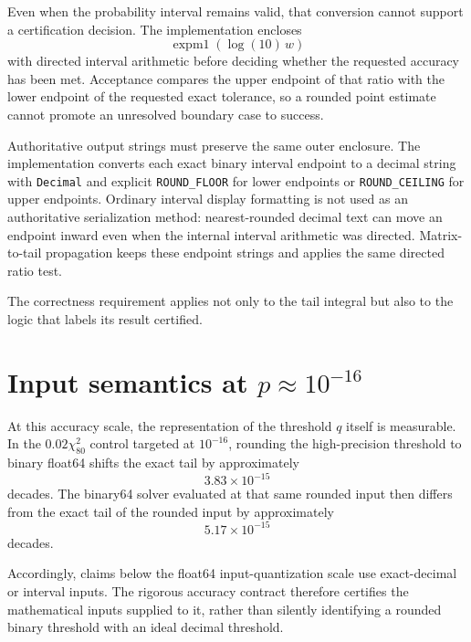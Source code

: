 Even when the probability interval remains valid, that conversion cannot
support a certification decision. The implementation encloses
\[
\boxed{
\operatorname{expm1}(\log(10)\,w)
}
\]
with directed interval arithmetic before deciding whether the requested
accuracy has been met.  Acceptance compares the upper endpoint of that ratio
with the lower endpoint of the requested exact tolerance, so a rounded point
estimate cannot promote an unresolved boundary case to success.

Authoritative output strings must preserve the same outer enclosure.  The
implementation converts each exact binary interval endpoint to a decimal
string with \texttt{Decimal} and explicit \texttt{ROUND\_FLOOR} for lower
endpoints or \texttt{ROUND\_CEILING} for upper endpoints.  Ordinary interval
display formatting is not used as an authoritative serialization method:
nearest-rounded decimal text can move an endpoint inward even when the
internal interval arithmetic was directed.  Matrix-to-tail propagation keeps
these endpoint strings and applies the same directed ratio test.

The correctness requirement applies not only to the tail integral but also
to the logic that labels its result certified.

\section{Input semantics at \texorpdfstring{\(p\approx10^{-16}\)}{p about 1e-16}}

At this accuracy scale, the representation of the threshold \(q\) itself is
measurable.  In the \(0.02\chi^2_{80}\) control targeted at \(10^{-16}\),
rounding the high-precision threshold to binary float64 shifts the exact tail
by approximately
\[
3.83\times10^{-15}
\]
decades.  The binary64 solver evaluated at that same rounded input
then differs from the exact tail of the rounded input by approximately
\[
5.17\times10^{-15}
\]
decades.

Accordingly, claims below the float64 input-quantization scale use exact-decimal
or interval inputs.  The rigorous accuracy contract therefore certifies the
mathematical inputs supplied to it, rather than silently identifying a rounded
binary threshold with an ideal decimal threshold.



